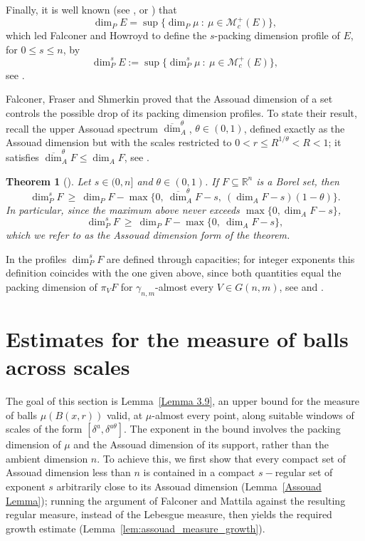 \documentclass[12pt]{amsart}
\newtheorem{theorem}{Theorem}[section]
\theoremstyle{definition}
\theoremstyle{remark}
\numberwithin{equation}{section}
\begin{document}
Finally, it is well known (see \cite{hu1994fractal}, or
\cite[(4.1)]{falconer1997packing}) that
\begin{equation}\label{eq:dimP_set_sup}
\dim_P E=\sup\{\dim_P\mu\ :\ \mu\in\mathcal{M}_c^+(E)\},
\end{equation}
which led Falconer and Howroyd to define the $s$-packing dimension
profile of $E$, for $0\leq s\leq n$, by
$$\dim_P^s E:=\sup\{\dim_P^s\mu\ :\ \mu\in\mathcal{M}_c^+(E)\},$$
see \cite[(5.3)]{falconer1997packing}.

Falconer, Fraser and Shmerkin proved that the Assouad dimension of a set
controls the possible drop of its packing dimension profiles. To state
their result, recall the upper Assouad spectrum
$\overline{\dim}_A^{\theta}$, $\theta\in(0,1)$, defined exactly as the
Assouad dimension but with the scales restricted to
$0<r\leq R^{1/\theta}<R<1$; it satisfies
$\overline{\dim}_A^{\theta}F\leq\dim_A F$, see \cite{fraser2020assouad}.

\begin{theorem}[{\cite[Theorem 2.2]{falconer2021assouad}}]\label{thm:FFS}
Let $s\in(0,n]$ and $\theta\in(0,1)$. If $F\subseteq\mathbb{R}^{n}$ is a
Borel set, then
$$\dim_P^{s}F\ \geq\ \dim_P F-\max\bigl\{0,\ \overline{\dim}_A^{\theta}F-s,\
(\dim_A F-s)(1-\theta)\bigr\}.$$
In particular, since the maximum above never exceeds
$\max\{0,\dim_A F-s\}$,
\begin{equation}\label{eq:FFS_assouad_form}
\dim_P^{s}F\ \geq\ \dim_P F-\max\{0,\ \dim_A F-s\},
\end{equation}
which we refer to as the \emph{Assouad dimension form} of the theorem.
\end{theorem}

In \cite{falconer2021assouad} the profiles $\dim_P^{s}F$ are defined
through capacities; for integer exponents this definition coincides with
the one given above, since both quantities equal the packing dimension
of $\pi_V F$ for $\gamma_{n,m}$-almost every $V\in G(n,m)$, see
\cite[Theorem 10]{falconer1997packing} and
\cite[Theorem 2.1]{falconer2021assouad}.


\section{Estimates for the measure of balls across scales}
The goal of this section is Lemma~\ref{Lemma 3.9}, an upper bound
for the measure of balls $\mu(B(x,r))$ valid, at $\mu$-almost every
point, along suitable windows of scales of the form
$[\delta^{a},\delta^{a\theta}]$. The exponent in the bound involves the
packing dimension of $\mu$ and the Assouad dimension of its support,
rather than the ambient dimension $n$. To achieve this, we first show
that every compact set of Assouad dimension less than $n$ is contained
in a compact $s-$regular set of exponent $s$ arbitrarily close to its
Assouad dimension (Lemma~\ref{Assouad Lemma}); running the argument of
Falconer and Mattila \cite{falconer1996packing} against the resulting
regular measure, instead of the Lebesgue measure, then yields the
required growth estimate (Lemma~\ref{lem:assouad_measure_growth}).
\end{document}
